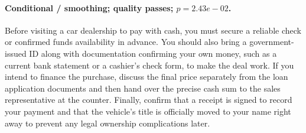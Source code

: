 \paragraph{Conditional / smoothing; quality passes; $p=2.43e-02$.} Before visiting a car dealership to pay with cash, you must secure a reliable check or confirmed funds availability in advance. You should also bring a government-issued ID along with documentation confirming your own money, such as a current bank statement or a cashier's check form, to make the deal work. If you intend to finance the purchase, discuss the final price separately from the loan application documents and then hand over the precise cash sum to the sales representative at the counter. Finally, confirm that a receipt is signed to record your payment and that the vehicle's title is officially moved to your name right away to prevent any legal ownership complications later.
